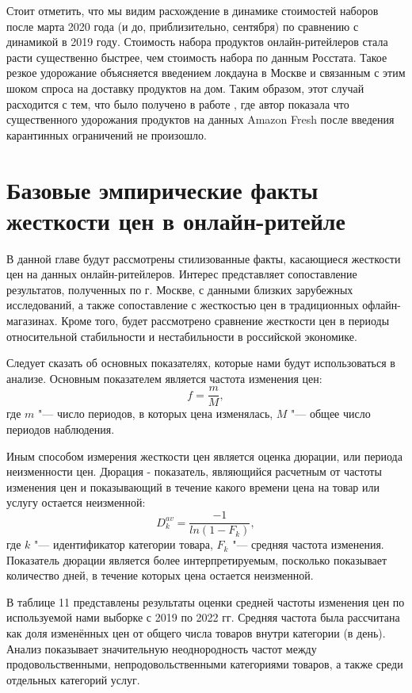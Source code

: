 Стоит отметить, что мы видим расхождение в динамике стоимостей наборов после марта 2020 года (и до, приблизительно, сентября) по сравнению с динамикой в 2019 году. Стоимость набора продуктов онлайн-ритейлеров стала расти существенно быстрее, чем стоимость набора по данным Росстата. Такое резкое удорожание объясняется введением локдауна в Москве и связанным с этим шоком спроса на доставку продуктов на дом. Таким образом, этот случай расходится с тем, что было получено в работе \cite{hillen2021covid}, где автор показала что существенного удорожания продуктов на данных Amazon Fresh после введения карантинных ограничений не произошло. 

\section{Базовые эмпирические факты жесткости цен в онлайн-ритейле}\label{sec:ch3/sec2}

В данной главе будут рассмотрены стилизованные факты, касающиеся жесткости цен на данных онлайн-ритейлеров. Интерес представляет сопоставление результатов, полученных по г. Москве, с данными близких зарубежных исследований, а также сопоставление с жесткостью цен в традиционных офлайн-магазинах. Кроме того, будет рассмотрено сравнение жесткости цен в периоды относительной стабильности и нестабильности в российской экономике.

Следует сказать об основных показателях, которые нами будут использоваться в анализе. Основным показателем является частота изменения цен:
\begin{equation}
	\label{eq:equation_freq}
	f=\frac{m}{M},
\end{equation}
где \( m \) "--- число периодов, в которых цена изменялась, \( M \) "--- общее число периодов наблюдения.

Иным способом измерения жесткости цен является оценка дюрации, или периода неизменности цен. Дюрация - показатель, являющийся расчетным от частоты изменения цен и показывающий в течение какого времени цена на товар или услугу остается неизменной:
\begin{equation}
	\label{eq:equation_duration}
	D_k^{av}=\frac{-1}{ln⁡(1-F_k)},
\end{equation}
где \( k \) "--- идентификатор категории товара, \( F_k \) "--- средняя частота изменения. Показатель дюрации является более интерпретируемым, посколько показывает количество дней, в течение которых цена остается неизменной.

В таблице 11 представлены результаты оценки средней частоты изменения цен по используемой нами выборке с 2019 по 2022 гг. Средняя частота была рассчитана как доля изменённых цен от общего числа товаров внутри категории (в день). Анализ показывает значительную неоднородность частот между продовольственными, непродовольственными категориями товаров, а также среди отдельных категорий услуг. 

